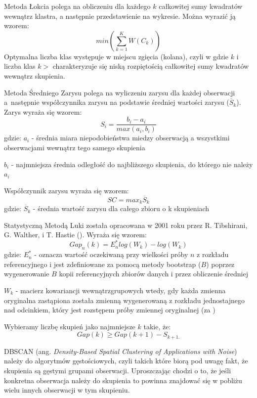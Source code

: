 \documentclass{amuthesis}
\begin{document}
Metoda Łokcia polega na obliczeniu dla każdego \(k\) całkowitej sumy kwadratów wewnątrz klastra, a następnie przedstawienie na wykresie.
Można wyrazić ją wzorem:
\[ min(\sum^K_{k=1} W(C_k))
\]
Optymalna liczba klas występuje w miejscu zgięcia (kolana), czyli w gdzie \(k\) i liczba klas \(k>\) charakteryzuje się niską rozpiętością całkowitej sumy kwadratów wewnątrz skupienia.

Metoda Średniego Zarysu polega na wyliczeniu zarysu dla każdej obserwacji a~następnie współczynnika zarysu na podstawie średniej wartości zarysu (\(\overline{S}_k\)). Zarys wyraża się wzorem:
\[ S_i = \frac{b_i - a_i}{max(a_i , b_i)}
\]
gdzie:
\(a_i\) - średnia miara niepodobieństwa miedzy obserwacją a wszystkimi obserwacjami wewnątrz tego samego skupienia

\(b_i\) - najmniejsza średnia odległość do najbliższego skupienia, do którego nie należy \(a_i\)

Współczynnik zarysu wyraża się wzorem:
\[ SC = max_k\overline{S}_k
\]
gdzie:
\(\overline{S}_k\) - średnia wartość zarysu dla całego zbioru o k skupieniach

Statystyczną Metodą Luki została opracowana w 2001 roku przez R. Tibshirani, G. Walther, i T. Hastie (\textcite{gap}).
Wyraża się wzorem:
\[ Gap_n(k) = E^*_nlog(W_k)-log(W_k)
\]
gdzie:
\(E^*_n\) - oznacza wartość oczekiwaną przy wielkości próby \(n\) z rozkładu referencyjnego i jest zdefiniowane za pomocą metody bootstrap (\(B\)) poprzez wygenerowanie \(B\) kopii referencyjnych zbiorów danych i przez obliczenie średniej

\(W_k\) - macierz kowariancji wewnątrzgrupowych wtedy, gdy każda zmienna
oryginalna zastąpiona została zmienną wygenerowaną z rozkładu jednostajnego nad odcinkiem, który jest rozstępem próby zmiennej oryginalnej (za \textcite{korzeniewski})

Wybieramy liczbę skupień jako najmniejsze \(k\) takie, że:
\[Gap(k)\ge Gap(k+1)-S_{k+1.}
\]

DBSCAN (ang. \emph{Density-Based Spatial Clustering of Applications with Noise}) należy do algorytmów gęstościowych, czyli takich które biorą pod uwagę fakt, że skupienia są gęstymi grupami obserwacji.
Uproszczając chodzi o to, że jeśli konkretna obserwacja należy do skupienia to powinna znajdować się w pobliżu wielu innych obserwacji w tym skupieniu.
\end{document}

